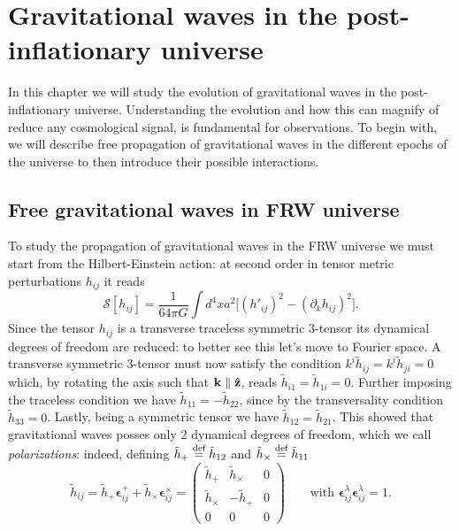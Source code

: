 \chapter{Gravitational waves in the post-inflationary universe}
\label{chap:GW}
In this chapter we will study the evolution of gravitational waves in the post-inflationary universe. Understanding the evolution and how this can magnify of reduce any cosmological signal, is fundamental for observations. To begin with, we will describe free propagation of gravitational waves in the different epochs of the universe to then introduce their possible interactions. 

\section{Free gravitational waves in FRW universe}
\label{sec:free_GW}
To study the propagation of gravitational waves in the FRW universe we must start from the Hilbert-Einstein action: at second order in tensor metric perturbations $h_{ij}$ it reads
\begin{equation*}
    \mathcal{S} [h_{ij}]=\frac{1}{64\pi G}\int d^4xa^2\Big[(h'_{ij})^2-(\partial_k h_{ij})^2\Big].
\end{equation*}
Since the tensor $h_{ij}$ is a transverse traceless symmetric 3-tensor its dynamical degrees of freedom are reduced: to better see this let's move to Fourier space. A transverse symmetric 3-tensor must now satisfy the condition $k^i\tilde h_{ij}=k^i \tilde h_{ji}=0$ which, by rotating the axis such that $\mathbf k\parallel\mathbf{\hat{z}}$, reads $\tilde{h}_{i1}=\tilde{h}_{1i}=0$. Further imposing the traceless condition we have $\tilde{h}_{11}=-\tilde h_{22}$, since by the transversality condition $\tilde{h}_{33}=0$. Lastly, being a symmetric tensor we have $\tilde{h}_{12}=\tilde{h}_{21}$. This showed that gravitational waves posses only 2 dynamical degrees of freedom, which we call \emph{polarizations}: indeed, defining $\tilde{h}_+\stackrel{\text{def}}{=}\tilde{h}_{12}$ and $ \tilde{h}_\times\stackrel{\text{def}}{=}\tilde{h}_{11}$
\begin{equation}
    \tilde{h}_{ij}=\tilde{h}_+\boldsymbol{\epsilon}_{ij}^++\tilde{h}_{\times}\boldsymbol{\epsilon}_{ij}^\times=
    \begin{pmatrix}
\tilde h_+ & \tilde h_\times & 0  \\ 
\tilde h_\times & -\tilde h_+ & 0  \\
0&0&0
    \end{pmatrix}\qquad\text{with }\boldsymbol{\epsilon}^\lambda_{ij}\boldsymbol{\epsilon}^{\lambda}_{ij}=1.
    \label{eq:GW-polarizations}
\end{equation}
